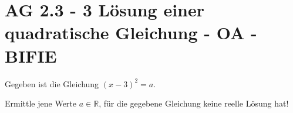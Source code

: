 \section{AG 2.3 - 3 Lösung einer quadratische Gleichung - OA - BIFIE}

\begin{beispiel}[AG 2.3]{1} %
	Gegeben ist die Gleichung $(x-3)^2=a$.
	
	Ermittle jene Werte $a \in \mathbb{R}$, für die gegebene Gleichung keine reelle Lösung hat!
	
\end{beispiel}